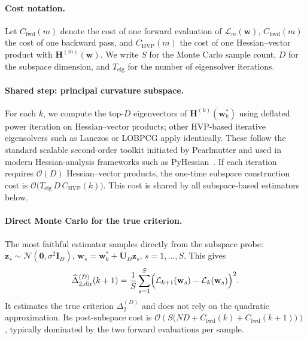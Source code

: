 \documentclass{article}
\begin{document}
\paragraph{Cost notation.}
Let $C_{\mathrm{fwd}}(m)$ denote the cost of one forward evaluation of $\mathcal L_m(\mathbf w)$, $C_{\mathrm{bwd}}(m)$ the cost of one backward pass, and $C_{\mathrm{HVP}}(m)$ the cost of one Hessian--vector product with $\mathbf H^{(m)}(\mathbf w)$.
We write $S$ for the Monte Carlo sample count, $D$ for the subspace dimension, and $T_{\mathrm{eig}}$ for the number of eigensolver iterations.

\paragraph{Shared step: principal curvature subspace.}
For each $k$, we compute the top-$D$ eigenvectors of $\mathbf H^{(k)}(\mathbf w_k^*)$ using deflated power iteration on Hessian--vector products; other HVP-based iterative eigensolvers such as Lanczos or LOBPCG apply identically. These follow the standard scalable second-order toolkit initiated by Pearlmutter and used in modern Hessian-analysis frameworks such as PyHessian~\citep{pearlmutter1994fast,yao2020pyhessian}. If each iteration requires $\mathcal O(D)$ Hessian--vector products, the one-time subspace construction cost is $\mathcal O \bigl(T_{\mathrm{eig}}\,D\,C_{\mathrm{HVP}}(k)\bigr)$. This cost is shared by all subspace-based estimators below.

\paragraph{Direct Monte Carlo for the true criterion.}
The most faithful estimator samples directly from the subspace probe: $\mathbf z_s \sim \mathcal N(\mathbf 0,\sigma^2\mathbf I_D)$, $\mathbf w_s=\mathbf w_k^*+\mathbf U_D\mathbf z_s$, $s=1,\dots,S$. This gives
\begin{equation}
\label{eq:direct-subspace-mc}
\widehat{\Delta}_{2,\mathrm{dir}}^{(D)}(k+1)
=
\frac{1}{S}\sum_{s=1}^S
\Bigl(
\mathcal L_{k+1}(\mathbf w_s)-\mathcal L_k(\mathbf w_s)
\Bigr)^2.
\end{equation}
It estimates the true criterion $\Delta_2^{(D)}$ and does not rely on the quadratic approximation. Its post-subspace cost is $\mathcal O \left( S\bigl( ND + C_{\mathrm{fwd}}(k)+C_{\mathrm{fwd}}(k+1) \bigr) \right)$, typically dominated by the two forward evaluations per sample.
\end{document}

